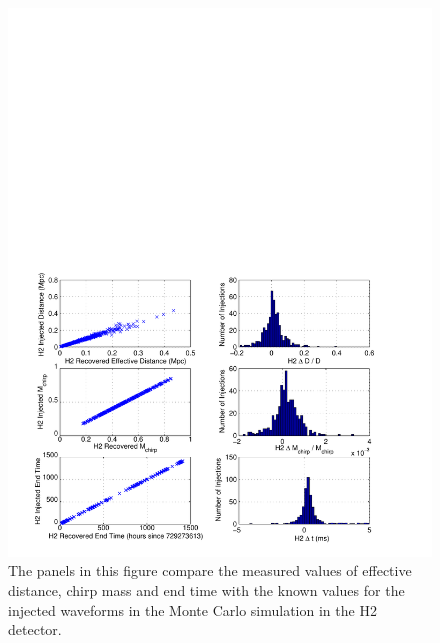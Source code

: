 \begin{figure}[p]
\begin{center}
\includegraphics[width=\textwidth]{figures/result/h2_param_error}
\end{center}
\caption[Measurement accuracy of H2 Injections Parameters]{%
\label{f:h2_param_error}%
The panels in this figure compare the measured values of effective distance,
chirp mass and end time with the known values for the injected waveforms in
the Monte Carlo simulation in the H2 detector.
}
\end{figure}

